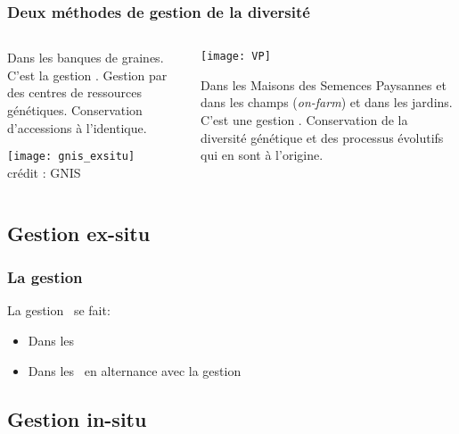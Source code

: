 \begin{frame}
\frametitle{Deux méthodes de gestion de la diversité}

\begin{columns}

\begin{column}{.4\textwidth}
Dans les banques de graines. C'est la gestion \exsitu. 
Gestion  par des centres de ressources génétiques.
Conservation d'accessions à l'identique.
\begin{center}
\texttt{[image: gnis\_exsitu]} \\
\tiny crédit : GNIS \\
\end{center}
\end{column}

\begin{column}{.6\textwidth}
\begin{center}
\texttt{[image: VP]}
\end{center}
Dans les Maisons des Semences Paysannes et dans les champs (\textit{on-farm}) et dans les jardins. C'est une gestion  \insitu.
Conservation de la diversité génétique et des processus évolutifs qui en sont à l'origine.
\end{column}

\end{columns}

\end{frame}


\subsection{Gestion ex-situ}

\begin{frame}
\frametitle{La gestion \exsitu}

La gestion \exsitu~se fait:

\begin{itemize}
\item Dans les \CRBs
\item Dans les \MSPs~en alternance avec la gestion \insitu
\end{itemize}


\end{frame}



\subsection{Gestion in-situ}


